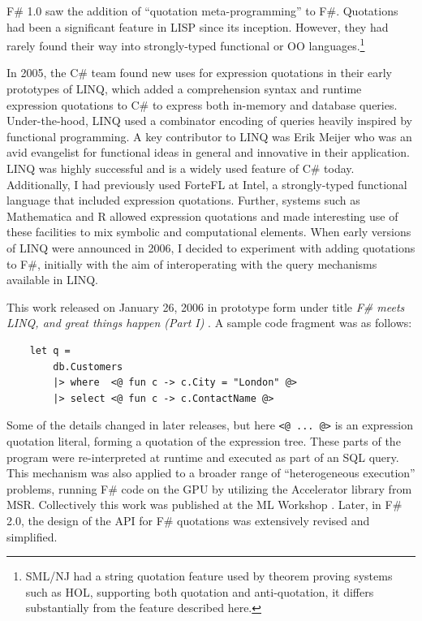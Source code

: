 \documentclass[acmsmall,screen]{acmart}
\begin{document}
F\# 1.0 saw the addition of “quotation meta-programming” to F\#.  Quotations had been a significant feature in LISP since its inception. However, they had rarely 
found their way into strongly-typed functional or OO languages.\footnote{SML/NJ had a string quotation feature used by theorem proving systems such as HOL, supporting both quotation and anti-quotation, it differs substantially from the feature described here.}


In 2005, the C\# team found new uses for expression quotations in their early prototypes of LINQ, which added a comprehension syntax and runtime expression quotations to C\# to express both in-memory and database queries. Under-the-hood, LINQ used a combinator encoding of queries heavily inspired by functional programming. A key contributor to LINQ was Erik Meijer who was an avid evangelist for functional ideas in general and innovative in their application. LINQ was highly successful and is a widely used feature of C\# today.  Additionally, I had previously used ForteFL at Intel, a strongly-typed functional language that included expression quotations.  Further, systems such as Mathematica and R allowed expression quotations and made interesting use of these facilities to mix symbolic and computational elements. When early versions of LINQ were announced in 2006, I decided to experiment with adding quotations to F\#, initially with the aim of interoperating with the query mechanisms available in LINQ.  

This work released on January 26, 2006 in prototype form under title \textit{F\# meets LINQ, and great things happen (Part I)} \citep{RefLinqFSharp}.   A sample code fragment was as follows:

\begin{verbatim}
    let q =
        db.Customers
        |> where  <@ fun c -> c.City = "London" @> 
        |> select <@ fun c -> c.ContactName @>
\end{verbatim}
Some of the details changed in later releases, but here \verb$<@ ... @>$ is an expression quotation literal, forming a quotation of the expression tree. These parts of the program were re-interpreted at runtime and executed as part of an SQL query.  This mechanism was also applied to a broader range of “heterogeneous execution” problems, running F\# code on the GPU by utilizing the Accelerator library from MSR. Collectively this work was published at the ML Workshop \citep{Syme2006a}. Later, in F\# 2.0, the design of the API for F\# quotations was extensively revised and simplified.
\end{document}
